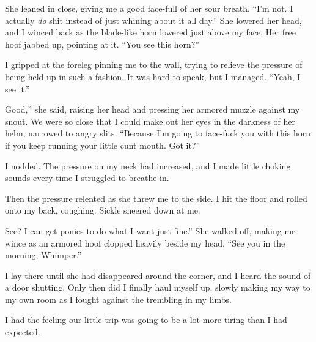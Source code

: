 She leaned in close, giving me a good face-full of her sour breath. “I’m not. I actually \textit{do} shit instead of just whining about it all day.” She lowered her head, and I winced back as the blade-like horn lowered just above my face. Her free hoof jabbed up, pointing at it. “You see this horn?”

I gripped at the foreleg pinning me to the wall, trying to relieve the pressure of being held up in such a fashion. It was hard to speak, but I managed. “Yeah, I see it.”

\leavevmode{}Good,” she said, raising her head and pressing her armored muzzle against my snout. We were so close that I could make out her eyes in the darkness of her helm, narrowed to angry slits. “Because I’m going to face-fuck you with this horn if you keep running your little cunt mouth. Got it?”

I nodded. The pressure on my neck had increased, and I made little choking sounds every time I struggled to breathe in.

Then the pressure relented as she threw me to the side. I hit the floor and rolled onto my back, coughing. Sickle sneered down at me.

\leavevmode{}See? I can get ponies to do what I want just fine.” She walked off, making me wince as an armored hoof clopped heavily beside my head. “See you in the morning, Whimper.”

I lay there until she had disappeared around the corner, and I heard the sound of a door shutting. Only then did I finally haul myself up, slowly making my way to my own room as I fought against the trembling in my limbs.

I had the feeling our little trip was going to be a lot more tiring than I had expected.